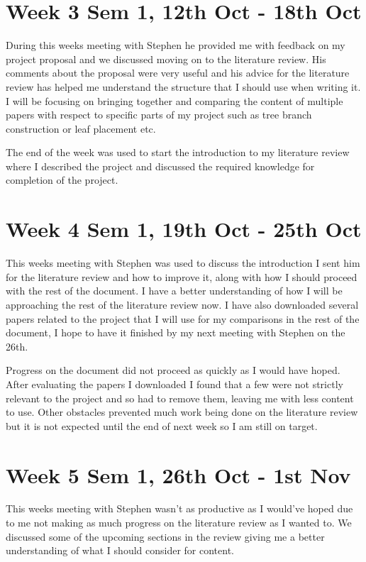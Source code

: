 \documentclass[11pt]{article}
\begin{document}
\section*{Week 3 Sem 1, 12th Oct - 18th Oct}
During this weeks meeting with Stephen he provided me with feedback on my project 
proposal and we discussed moving on to the literature review. His comments about the 
proposal were very useful and his advice for the literature review has helped me 
understand the structure that I should use when writing it. I will be focusing on 
bringing together and comparing the content of multiple papers with respect to specific 
parts of my project such as tree branch construction or leaf placement etc.

The end of the week was used to start the introduction to my literature review where 
I described the project and discussed the required knowledge for completion of the 
project.

\section*{Week 4 Sem 1, 19th Oct - 25th Oct}
This weeks meeting with Stephen was used to discuss the introduction I sent him for 
the literature review and how to improve it, along with how I should proceed with the 
rest of the document. I have a better understanding of how I will be approaching the 
rest of the literature review now. I have also downloaded several papers related to 
the project that I will use for my comparisons in the rest of the document, I hope to 
have it finished by my next meeting with Stephen on the 26th.

Progress on the document did not proceed as quickly as I would have hoped. After 
evaluating the papers I downloaded I found that a few were not strictly relevant to 
the project and so had to remove them, leaving me with less content to use. Other 
obstacles prevented much work being done on the literature review but it is not 
expected until the end of next week so I am still on target.

\section*{Week 5 Sem 1, 26th Oct - 1st Nov}
This weeks meeting with Stephen wasn't as productive as I would've hoped due to me not 
making as much progress on the literature review as I wanted to. We discussed some of 
the upcoming sections in the review giving me a better understanding of what I should 
consider for content.
\end{document}
